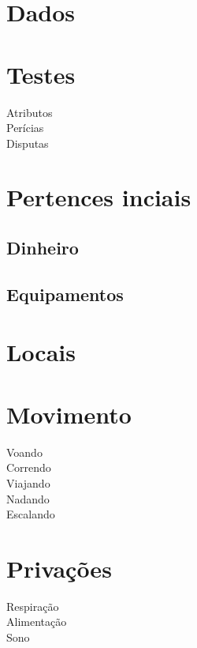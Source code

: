 \section{Dados}

\section{Testes}
\begin{description}
\item[Atributos]
\item[Perícias]
\item[Disputas]
\end{description}

\section{Pertences inciais}
\subsection{Dinheiro}
\subsection{Equipamentos}

\section{Locais}

\section{Movimento}
\begin{description}
\item[Voando]
\item[Correndo]
\item[Viajando]
\item[Nadando]
\item[Escalando]
\end{description}

\section{Privações}
\begin{description}
\item[Respiração]
\item[Alimentação]
\item[Sono]
\end{description}
